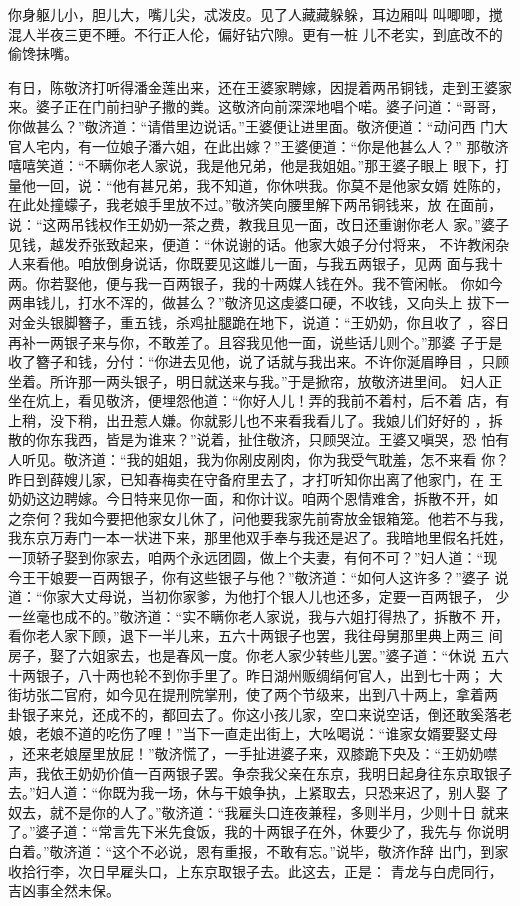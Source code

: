 你身躯儿小，胆儿大，嘴儿尖，忒泼皮。见了人藏藏躲躲，耳边厢叫
叫唧唧，搅混人半夜三更不睡。不行正人伦，偏好钻穴隙。更有一桩
儿不老实，到底改不的偷馋抹嘴。

有日，陈敬济打听得潘金莲出来，还在王婆家聘嫁，因提着两吊铜钱，走到王婆家
来。婆子正在门前扫驴子撒的粪。这敬济向前深深地唱个喏。婆子问道：“哥哥，
你做甚么？”敬济道：“请借里边说话。”王婆便让进里面。敬济便道：“动问西
门大官人宅内，有一位娘子潘六姐，在此出嫁？”王婆便道：“你是他甚么人？”
那敬济嘻嘻笑道：“不瞒你老人家说，我是他兄弟，他是我姐姐。”那王婆子眼上
眼下，打量他一回，说：“他有甚兄弟，我不知道，你休哄我。你莫不是他家女婿
姓陈的，在此处撞蠓子，我老娘手里放不过。”敬济笑向腰里解下两吊铜钱来，放
在面前，说：“这两吊钱权作王奶奶一茶之费，教我且见一面，改日还重谢你老人
家。”婆子见钱，越发乔张致起来，便道：“休说谢的话。他家大娘子分付将来，
不许教闲杂人来看他。咱放倒身说话，你既要见这雌儿一面，与我五两银子，见两
面与我十两。你若娶他，便与我一百两银子，我的十两媒人钱在外。我不管闲帐。
你如今两串钱儿，打水不浑的，做甚么？”敬济见这虔婆口硬，不收钱，又向头上
拔下一对金头银脚簪子，重五钱，杀鸡扯腿跪在地下，说道：“王奶奶，你且收了
，容日再补一两银子来与你，不敢差了。且容我见他一面，说些话儿则个。”那婆
子于是收了簪子和钱，分付：“你进去见他，说了话就与我出来。不许你涎眉睁目
，只顾坐着。所许那一两头银子，明日就送来与我。”于是掀帘，放敬济进里间。
妇人正坐在炕上，看见敬济，便埋怨他道：“你好人儿！弄的我前不着村，后不着
店，有上稍，没下稍，出丑惹人嫌。你就影儿也不来看我看儿了。我娘儿们好好的
，拆散的你东我西，皆是为谁来？”说着，扯住敬济，只顾哭泣。王婆又嗔哭，恐
怕有人听见。敬济道：“我的姐姐，我为你剐皮剐肉，你为我受气耽羞，怎不来看
你？昨日到薛嫂儿家，已知春梅卖在守备府里去了，才打听知你出离了他家门，在
王奶奶这边聘嫁。今日特来见你一面，和你计议。咱两个恩情难舍，拆散不开，如
之奈何？我如今要把他家女儿休了，问他要我家先前寄放金银箱笼。他若不与我，
我东京万寿门一本一状进下来，那里他双手奉与我还是迟了。我暗地里假名托姓，
一顶轿子娶到你家去，咱两个永远团圆，做上个夫妻，有何不可？”妇人道：“现
今王干娘要一百两银子，你有这些银子与他？”敬济道：“如何人这许多？”婆子
说道：“你家大丈母说，当初你家爹，为他打个银人儿也还多，定要一百两银子，
少一丝毫也成不的。”敬济道：“实不瞒你老人家说，我与六姐打得热了，拆散不
开，看你老人家下顾，退下一半儿来，五六十两银子也罢，我往母舅那里典上两三
间房子，娶了六姐家去，也是春风一度。你老人家少转些儿罢。”婆子道：“休说
五六十两银子，八十两也轮不到你手里了。昨日湖州贩绸绢何官人，出到七十两；
大街坊张二官府，如今见在提刑院掌刑，使了两个节级来，出到八十两上，拿着两
卦银子来兑，还成不的，都回去了。你这小孩儿家，空口来说空话，倒还敢奚落老
娘，老娘不道的吃伤了哩！”当下一直走出街上，大吆喝说：“谁家女婿要娶丈母
，还来老娘屋里放屁！”敬济慌了，一手扯进婆子来，双膝跪下央及：“王奶奶噤
声，我依王奶奶价值一百两银子罢。争奈我父亲在东京，我明日起身往东京取银子
去。”妇人道：“你既为我一场，休与干娘争执，上紧取去，只恐来迟了，别人娶
了奴去，就不是你的人了。”敬济道：“我雇头口连夜兼程，多则半月，少则十日
就来了。”婆子道：“常言先下米先食饭，我的十两银子在外，休要少了，我先与
你说明白着。”敬济道：“这个不必说，恩有重报，不敢有忘。”说毕，敬济作辞
出门，到家收拾行李，次日早雇头口，上东京取银子去。此这去，正是：
青龙与白虎同行，吉凶事全然未保。